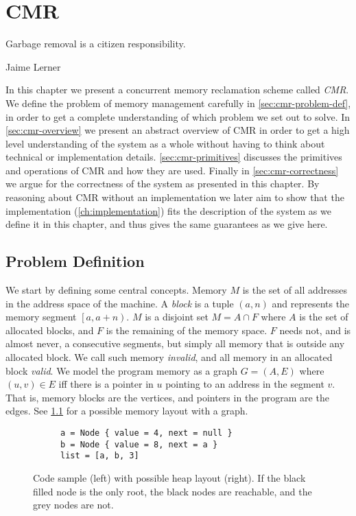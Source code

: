 \chapter{CMR\label{ch:cmr}}
\epigraph{Garbage removal is a citizen responsibility.}{Jaime Lerner}

In this chapter we present a concurrent memory reclamation scheme called \emph{CMR}.  We define the
problem of memory management carefully in \cref{sec:cmr-problem-def}, in order to get a complete
understanding of which problem we set out to solve.  In \cref{sec:cmr-overview} we present an
abstract overview of CMR in order to get a high level understanding of the system as a whole
without having to think about technical or implementation details.  \cref{sec:cmr-primitives}
discusses the primitives and operations of CMR and how they are used.  Finally in
\cref{sec:cmr-correctness} we argue for the correctness of the system as presented in this chapter.
By reasoning about CMR without an implementation we later aim to show that the implementation
(\cref{ch:implementation}) fits the description of the system as we define it in this chapter, and
thus gives the same guarantees as we give here.


\clearpage

\section{Problem Definition\label{sec:cmr-problem-def}}

We start by defining some central concepts. Memory $M$ is the set of all addresses in the address
space of the machine. A \emph{block} is a tuple $(a, n)$ and represents the memory segment
$\left[a, a + n\right)$. $M$ is a disjoint set $M = A \cap F$ where $A$ is the set of allocated
blocks, and $F$ is the remaining of the memory space. $F$ needs not, and is almost never, a
consecutive segments, but simply all memory that is outside any allocated block. We call such
memory \emph{invalid}, and all memory in an allocated block \emph{valid}.  We model the program
memory as a graph $G = (A, E)$ where $(u, v) \in E$ iff there is a pointer in $u$ pointing to an
address in the segment $v$. That is, memory blocks are the vertices, and pointers in the program
are the edges. See \cref{fig:memory-graph} for a possible memory layout with a graph.

\begin{figure}[ht]
  \centering
  \begin{subfigure}{0.45\textwidth}
    \begin{lstlisting}[style=Rust]
a = Node { value = 4, next = null }
b = Node { value = 8, next = a }
list = [a, b, 3]
    \end{lstlisting}
  \end{subfigure}
  \hfill
  \begin{subfigure}{0.45\textwidth}
    
  \end{subfigure}
  \caption{Code sample (left) with possible heap layout (right). If the black filled node is the
  only root, the black nodes are reachable, and the grey nodes are not.\label{fig:memory-graph}}
\end{figure}

